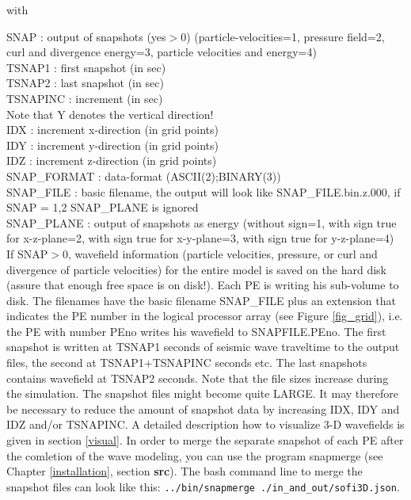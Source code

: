 \documentclass[11pt,onecolumn,oneside]{article}
\begin{document}
with

SNAP : output of snapshots (yes$>$0) (particle-velocities=1, pressure field=2, curl and divergence energy=3, particle velocities and energy=4)\\
TSNAP1 : first snapshot (in sec)\\
TSNAP2 : last snapshot (in sec)\\
TSNAPINC : increment (in sec)\\
Note that Y denotes the vertical direction!\\
IDX : increment x-direction (in grid points)\\
IDY : increment y-direction (in grid points)\\
IDZ : increment z-direction (in grid points)\\
SNAP\_FORMAT : data-format (ASCII(2);BINARY(3))\\
SNAP\_FILE : basic filename, the output will look like SNAP\_FILE.bin.z.000, if SNAP = 1,2 SNAP\_PLANE is ignored\\
SNAP\_PLANE : output of snapshots as energy (without sign=1, with sign true for x-z-plane=2, with sign true for x-y-plane=3, with sign true for y-z-plane=4)\\


If SNAP$>0$, wavefield information (particle velocities, pressure, or curl and divergence of particle velocities) for the entire model is saved on the hard disk (assure that enough free space is on disk!). Each PE is writing his sub-volume to disk. The filenames have the basic filename SNAP\_FILE plus an extension that indicates the PE number in the logical processor array (see Figure \ref{fig_grid}), i.e. the PE with number PEno writes his wavefield to SNAPFILE.PEno. The first snapshot is written at TSNAP1 seconds of seismic wave traveltime to the output files, the second at TSNAP1+TSNAPINC seconds etc. The last snapshots contains wavefield at TSNAP2 seconds. Note that the file sizes increase during the simulation. The snapshot files might become quite LARGE. It may therefore be necessary to reduce the amount of snapshot data by increasing IDX, IDY and IDZ and/or TSNAPINC. A detailed description how to visualize 3-D wavefields is given in section \ref{visual}. In order to merge the separate snapshot of each PE after the comletion of the wave modeling, you can use the program snapmerge (see Chapter \ref{installation}, section \textbf{src}). The bash command line to merge the snapshot files can look like this:  \lstinline{../bin/snapmerge ./in_and_out/sofi3D.json}.
\end{document}
